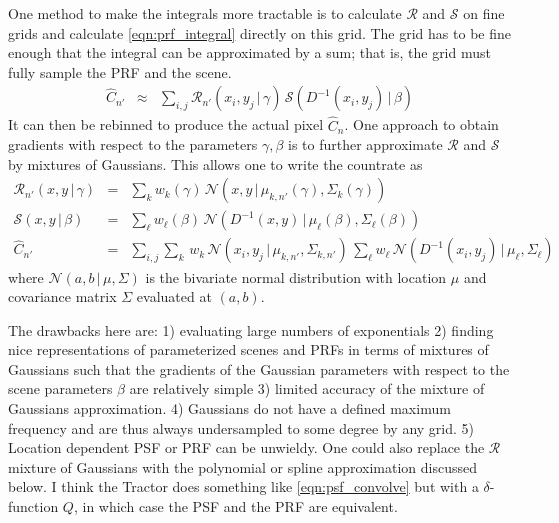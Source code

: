 \documentclass[modern]{aastex62}
\newcommand{\given}{\,|\,}
\newcommand{\countrate}{\hat{C}}
\newcommand{\prf}{\mathcal{R}}
\newcommand{\qe}{Q}
\newcommand{\scene}{\mathcal{S}}
\newcommand{\normal}{\mathcal{N}}
\begin{document}
One method to make the integrals more tractable is to calculate $\prf$ and
$\scene$ on fine grids and calculate \ref{eqn:prf_integral} directly on this
grid. The grid has to be fine enough that the integral can be approximated by a
sum; that is, the grid must fully sample the PRF and the scene.
\begin{eqnarray}
\label{eqn:prf_grid}
\countrate_{n'} & \approx & \sum_{i,j} \prf_{n'}(x_i, y_j \given \gamma) \, \scene( D^{-1}(x_i, y_j) \given \beta) \nonumber
\end{eqnarray}
It can then be rebinned to produce the actual pixel $\countrate_n$.
One approach to obtain gradients with respect to the parameters $\gamma, \beta$ is to further approximate $\prf$ and $\scene$ by mixtures of Gaussians.
This allows one to write the countrate as 
\begin{eqnarray}
\prf_{n'}(x, y \given \gamma)  & = & \sum_k w_k(\gamma) \, \normal(x, y \given \mu_{k, n'}(\gamma), \Sigma_k(\gamma)) \\
\scene(x, y \given \beta) & = & \sum_\ell w_\ell(\beta) \, \normal(D^{-1}(x, y) \given \mu_\ell(\beta), \Sigma_\ell(\beta)) \nonumber \\
\countrate_{n'} & = & \sum_{i,j}\sum_{k} \, w_k \, \normal(x_i, y_j \given \mu_{k, n'}, \Sigma_{k, n'}) \, \sum_\ell w_\ell \, \normal(D^{-1}(x_i, y_j) \given \mu_{\ell}, \Sigma_{\ell}) \nonumber
\end{eqnarray}
where $\normal(a, b \given \mu, \Sigma)$ is the bivariate normal distribution with location $\mu$ and covariance matrix $\Sigma$ evaluated at $(a, b)$.


The drawbacks here are:
   1) evaluating large numbers of exponentials
   2) finding nice representations of parameterized scenes and PRFs in terms of mixtures of Gaussians such that the gradients of the Gaussian parameters with respect to the scene parameters $\beta$ are relatively simple
   3) limited accuracy of the mixture of Gaussians approximation.
   4) Gaussians do not have a defined maximum frequency and are thus always undersampled to some degree by any grid.
   5) Location dependent PSF or PRF can be unwieldy.
One could also replace the $\prf$ mixture of Gaussians with the polynomial or spline approximation discussed below.
I think the Tractor does something like \ref{eqn:psf_convolve} but with a $\delta$-function $\qe$, in which case the PSF and the PRF are equivalent.
\end{document}
